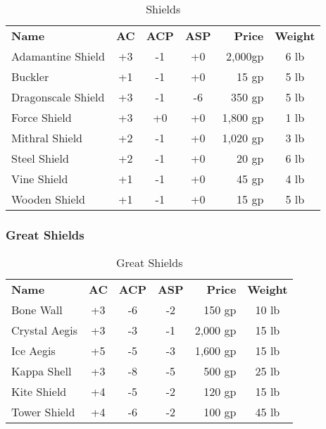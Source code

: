 \begin{table}[htb]
\caption{Shields}
\centering
\begin{tabular}{l *{3}{c} r c}
\textbf{Name} & \textbf{AC} & \textbf{ACP} & \textbf{ASP} & \textbf{Price} & \textbf{Weight}\\
Adamantine Shield & +3 & -1 & +0 & 2,000gp & 6 lb\\
Buckler & +1 & -1 & +0 & 15 gp & 5 lb\\
Dragonscale Shield & +3 & -1 & -6 & 350 gp & 5 lb\\
Force Shield & +3 & +0 & +0 & 1,800 gp & 1 lb\\
Mithral Shield & +2 & -1 & +0 & 1,020 gp & 3 lb\\
Steel Shield & +2 & -1 & +0 & 20 gp & 6 lb\\
Vine Shield & +1 & -1 & +0 & 45 gp & 4 lb\\
Wooden Shield & +1 & -1 & +0 & 15 gp & 5 lb\\
\end{tabular}
\end{table}


\subsubsection{Great Shields}

\begin{table}[htb]
\caption{Great Shields}
\centering
\begin{tabular}{l *{3}{c} r c}
\textbf{Name} & \textbf{AC} & \textbf{ACP} & \textbf{ASP} & \textbf{Price} & \textbf{Weight}\\
Bone Wall & +3 & -6 & -2 & 150 gp & 10 lb\\
Crystal Aegis & +3 & -3 & -1 & 2,000 gp & 15 lb\\
Ice Aegis & +5 & -5 & -3 & 1,600 gp & 15 lb\\
Kappa Shell & +3 & -8 & -5 & 500 gp & 25 lb\\
Kite Shield & +4  & -5 & -2 & 120 gp & 15 lb\\
Tower Shield & +4 & -6 & -2 & 100 gp & 45 lb\\
\end{tabular}
\end{table}

